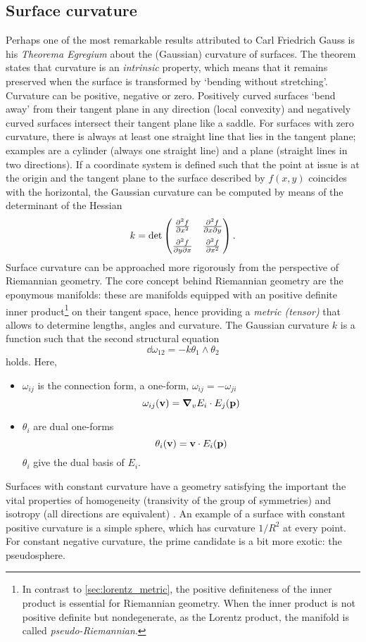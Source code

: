 \subsection{Surface curvature}
Perhaps one of the most remarkable results attributed to Carl Friedrich Gauss is his \emph{Theorema Egregium} about the (Gaussian) curvature of surfaces. The theorem states that curvature is an \emph{intrinsic} property, which means that it remains preserved when the surface is transformed by `bending without stretching'. Curvature can be positive, negative or zero. Positively curved surfaces `bend away' from their tangent plane in any direction (local convexity) and negatively curved surfaces intersect their tangent plane like a saddle. For surfaces with zero curvature, there is always at least one straight line that lies in the tangent plane; examples are a cylinder (always one straight line) and a plane (straight lines in two directions). If a coordinate system is defined such that the point at issue is at the origin and the tangent plane to the surface described by \(f(x, y)\) coincides with the horizontal, the Gaussian curvature can be computed by means of the determinant of the Hessian \cite{Thurston1997, ONeill2006}
    \[ 
        k = \det \begin{pmatrix}
                \pdv[2]{f}{x} & \pdv{f}{x}{y}\\[6pt]
                \pdv{f}{y}{x} & \pdv[2]{f}{x}
        \end{pmatrix}.
    \]
Surface curvature can be approached more rigorously from the perspective of Riemannian geometry. The core concept behind Riemannian geometry are the eponymous manifolds: these are manifolds equipped with an positive definite inner product\footnote{In contrast to \cref{sec:lorentz_metric}, the positive definiteness of the inner product is essential for Riemannian geometry. When the inner product is not positive definite but nondegenerate, as the Lorentz product, the manifold is called \emph{pseudo-Riemannian}.} on their tangent space, hence providing a \emph{metric (tensor)} that allows to determine lengths, angles and curvature. The Gaussian curvature \(k\) is a function such that the second structural equation
    \[
        \dd{\omega_{12}} = -k \theta_1 \wedge \theta_2
    \]
holds. Here, 
\begin{itemize}
    \item \(\omega_{ij}\) is the connection form, a one-form, \(
        \omega_{ij} = - \omega_{ji}\)
        \[ 
            \omega_{ij}(\vb{v}) = \grad_v E_i \cdot E_j (\vb{p})
        \]
    \item \(\theta_i\) are dual one-forms
        \[ 
            \theta_i(\vb{v}) = \vb{v}\cdot E_i(\vb{p}) 
        \]
        \(\theta_i\) give the dual basis of \(E_i\).
\end{itemize}
Surfaces with constant curvature have a geometry satisfying the important the vital properties of homogeneity (transivity of the group of symmetries) and isotropy (all directions are equivalent) \cite{Thurston1997}. An example of a surface with constant positive curvature is a simple sphere, which has curvature \(1/R^2\) at every point. For constant negative curvature, the prime candidate is a bit more exotic: the pseudosphere.

